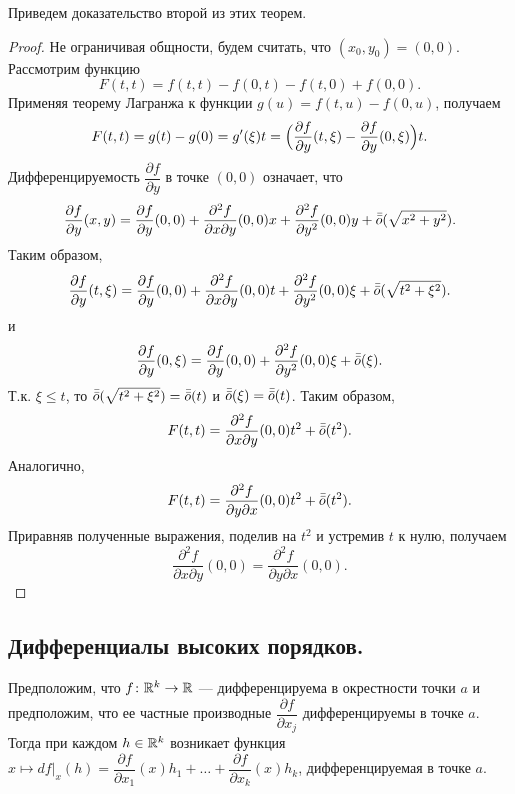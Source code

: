 \documentclass[a4paper]{article}
\theoremstyle{named}
\begin{document}
    Приведем доказательство второй из этих теорем.

    \begin{proof}
        Не ограничивая общности, будем считать, что $(x_0,y_0)=(0,0)$.
        Рассмотрим функцию
        $$
        F(t,t) = f(t,t) - f(0,t) - f(t,0) + f(0,0).
        $$
        Применяя теорему Лагранжа к функции $g(u)= f(t,u)-f(0,u)$,
        получаем
        $$
        F(t,t) = g(t) - g(0) = g'(\xi)t = \Bigl(\dfrac{\partial f}{\partial y}(t,\xi) -  \dfrac{\partial f}{\partial y}(0,\xi)\Bigr)t.
        $$
        Дифференцируемость $\dfrac{\partial f}{\partial y}$ в точке $(0,0)$ означает, что
        $$
        \dfrac{\partial f}{\partial y}(x,y) = \dfrac{\partial f}{\partial y}(0,0) +
        \dfrac{\partial^2 f}{\partial x\partial y}(0,0)x + \dfrac{\partial^2 f}{\partial y^2}(0,0)y + \bar{\bar{o}}(\sqrt{x^2+y^2}).
        $$
        Таким образом,
        $$
        \dfrac{\partial f}{\partial y}(t,\xi) = \dfrac{\partial f}{\partial y}(0,0) +
        \dfrac{\partial^2 f}{\partial x\partial y}(0,0)t + \dfrac{\partial^2 f}{\partial y^2}(0,0)\xi + \bar{\bar{o}}(\sqrt{t^2+\xi^2}).
        $$
        и
        $$
        \dfrac{\partial f}{\partial y}(0,\xi) = \dfrac{\partial f}{\partial y}(0,0) +
        \dfrac{\partial^2 f}{\partial y^2}(0,0)\xi + \bar{\bar{o}}(\xi).
        $$
        Т.к. $\xi\leq t$, то $\bar{\bar{o}}(\sqrt{t^2+\xi^2}) = \bar{\bar{o}}(t)$ и $\bar{\bar{o}}(\xi) = \bar{\bar{o}}(t)$.
        Таким образом,
        $$
        F(t,t) = \dfrac{\partial^2 f}{\partial x\partial y}(0,0)t^2 + \bar{\bar{o}}(t^2).
        $$
        Аналогично,
        $$
        F(t,t) = \dfrac{\partial^2 f}{\partial y\partial x}(0,0)t^2 + \bar{\bar{o}}(t^2).
        $$
        Приравняв полученные выражения, поделив на $t^2$ и устремив $t$ к нулю, получаем
        $$
        \dfrac{\partial^2 f}{\partial x\partial y}(0,0) = \dfrac{\partial^2 f}{\partial y\partial x}(0,0).
        $$
    \end{proof}

    \subsection{Дифференциалы высоких порядков.}

    Предположим, что $f\colon \mathbb{R}^k\to \mathbb{R}$ --- дифференцируема в окрестности точки $a$ и предположим, что ее частные производные
    $\dfrac{\partial f}{\partial x_j}$ дифференцируемы в точке $a$.
    Тогда при каждом $h\in \mathbb{R}^k$ возникает функция $x\mapsto df\bigl|_x(h)=\dfrac{\partial f}{\partial x_1}(x)h_1+\ldots+\dfrac{\partial f}{\partial x_k}(x)h_k$, дифференцируемая в точке $a$.
    
\end{document}
